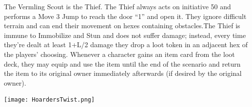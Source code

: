 \documentclass[fontsize=11pt]{scrartcl}
\begin{document}
\begin{minipage}{0.3\textwidth}
{The Vermling Scout is the Thief. The Thief always acts on initiative 50 and performs a Move 3 Jump to reach the door “1” and open it. They ignore difficult terrain and can end their movement on hexes containing obstacles.The Thief is immune to Immobilize and Stun and does not suffer damage; instead, every time they’re dealt at least 1+L/2 damage they drop a loot token in an adjacent hex of the players’ choosing. Whenever a character gains an item card from the loot deck, they may equip and use the item until the end of the scenario and return the item to its original owner immediately afterwards (if desired by the original owner).
}
	\end{minipage}
	\begin{minipage}{\textwidth}
			\texttt{[image: HoardersTwist.png]}
	\end{minipage} 
	\newpage
\end{document}

